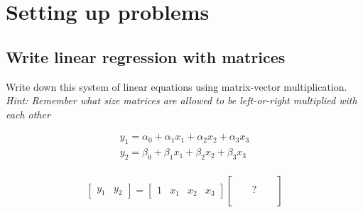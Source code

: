 \documentclass[11pt]{article}
\begin{document}
\section{Setting up problems}

\subsection{Write linear regression with matrices}

Write down this system of linear equations using matrix-vector
multiplication.  \emph{ Hint: Remember what size matrices are allowed
to be left-or-right multiplied with each other}

\begin{equation}
    \begin{array}{l}
    y_1 = \alpha_0 + \alpha_1 x_1  + \alpha_2 x_2 + \alpha_3 x_3 \\
    y_2 = \beta_0 + \beta_1 x_1  + \beta_2 x_2 + \beta_3 x_3 \\
    \end{array}
\end{equation}

\begin{equation}
    \begin{bmatrix}
        y_1 &  y_2 
    \end{bmatrix}
    = 
    \begin{bmatrix}
        1 & x_1 & x_2 & x_3
    \end{bmatrix}
    \begin{bmatrix}
        & & & &  \\ 
        & & ? & & \\
        & & & &   \\ 
    \end{bmatrix}
\end{equation}

\end{document}
